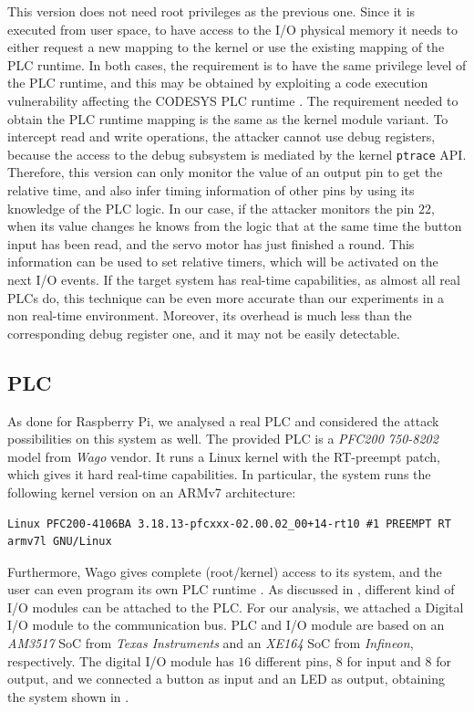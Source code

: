 This version does not need root privileges as the previous one. Since it is executed from user space, to have access to the I/O physical memory it needs to either
request a new mapping to the kernel or use the existing mapping of the PLC runtime. In both cases, the requirement is to have the same privilege level of the PLC runtime,
and this may be obtained by exploiting a code execution vulnerability affecting the CODESYS PLC runtime \cite{abb-codesys,codesys-server}.
The requirement needed to obtain the PLC runtime mapping is the same as the kernel module variant.
To intercept read and write operations, the attacker cannot use debug registers, because the access to the debug subsystem is mediated by the kernel \verb|ptrace| API.
Therefore, this version can only monitor the value of an output pin to get the relative time, and also infer timing information of other pins
by using its knowledge of the PLC logic. In our case, if the attacker monitors the pin $22$, when its value changes he knows from the logic
that at the same time the button input has been read, and the servo motor has just finished a round.
This information can be used to set relative timers, which will be activated on the next I/O events.
If the target system has real-time capabilities, as almost all real PLCs do, this technique can be even more accurate than our experiments in a non real-time environment.
Moreover, its overhead is much less than the corresponding debug register one, and it may not be easily detectable.


\subsection{PLC}
\label{sec:attack-plc}

As done for Raspberry Pi, we analysed a real PLC and considered the attack possibilities on this system as well.
The provided PLC is a \emph{PFC200 750-8202} model from \emph{Wago} vendor. It runs a Linux kernel with the RT-preempt patch, which gives it hard real-time capabilities.
In particular, the system runs the following kernel version on an ARMv7 architecture:
\begin{Verbatim}[fontsize=\small]
  Linux PFC200-4106BA 3.18.13-pfcxxx-02.00.02_00+14-rt10 #1 PREEMPT RT armv7l GNU/Linux
\end{Verbatim}
Furthermore, Wago gives complete (root/kernel) access to its system, and the user can even program its own PLC runtime \cite{wago-linux}.
As discussed in , different kind of I/O modules can be attached to the PLC. For our analysis, we attached a Digital I/O module to the communication bus.
PLC and I/O module are based on an \emph{AM3517} SoC from \emph{Texas Instruments} and an \emph{XE164} SoC from \emph{Infineon}, respectively.
The digital I/O module has $16$ different pins, $8$ for input and $8$ for output, and we connected a button as input and an LED as output,
obtaining the system shown in .

